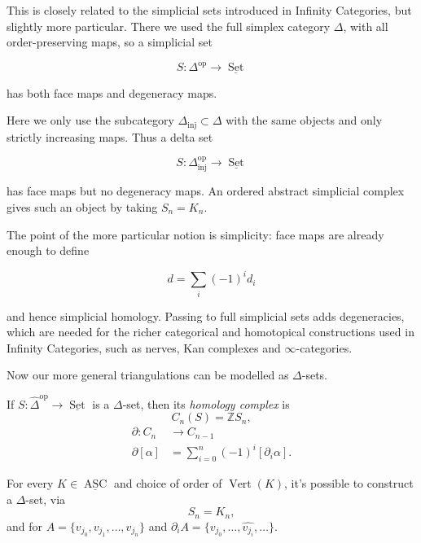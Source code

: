 \begin{remark}
\label{remark-delta-sets-vs-simplicial-sets}
This is closely related to the simplicial sets
introduced in Infinity Categories, but slightly
more particular. There we used the full simplex
category $\Delta$, with all order-preserving
maps, so a simplicial set

$$
S:\Delta^{\operatorname{op}}
\to \underline{\operatorname{Set}}
$$

has both face maps and degeneracy maps.

Here we only use the subcategory
$\Delta_{\mathrm{inj}}\subset\Delta$ with the
same objects and only strictly increasing maps.
Thus a delta set

$$
S:\Delta_{\mathrm{inj}}^{\operatorname{op}}
\to \underline{\operatorname{Set}}
$$

has face maps but no degeneracy maps. An
ordered abstract simplicial complex gives such
an object by taking $S_n=K_n$.

The point of the more particular notion is
simplicity: face maps are already enough to
define

$$
d=\sum_i(-1)^id_i
$$

and hence simplicial homology. Passing to full
simplicial sets adds degeneracies, which are
needed for the richer categorical and
homotopical constructions used in Infinity
Categories, such as nerves, Kan complexes and
$\infty$-categories.
\end{remark}


\noindent
Now our more general triangulations
can be modelled as $\Delta$-sets.


\begin{definition}
\label{definition-homology-complex}
If $S: \hat{\Delta}^{\mathrm{op}}
\to \underline{\operatorname{Set}}$
is a $\Delta$-set, then its {\it homology
complex} is
$$
C_n(S) = \mathbb{Z} S_n,
$$
$$
\begin{aligned}
\partial: C_n &\longrightarrow C_{n-1} \\
\partial[\alpha] &=
\sum_{i=0}^n (-1)^i[\partial_i\alpha].
\end{aligned}
$$
\end{definition}

\noindent
For every $K \in \underline{\operatorname{ASC}}$
and choice of order of
$\operatorname{Vert}(K)$, it's possible
to construct a $\Delta$-set, via
$$
S_n=K_n,
$$
and for $A = \{v_{j_0},v_{j_1},\dots,
v_{j_n}\}$ and $\partial_iA 
=
\{v_{j_0},\dots,\widehat{v_{j_i}},\dots\}$.

